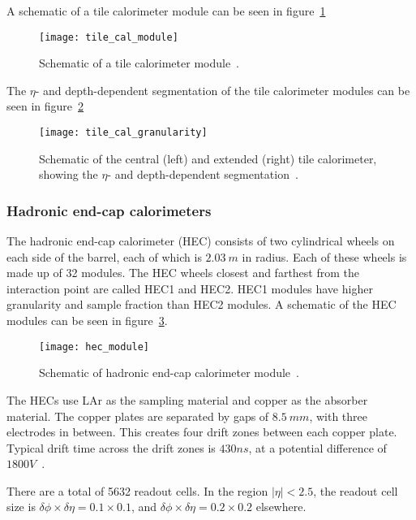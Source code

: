 A schematic of a tile calorimeter module can be seen in figure~\ref{fig:tile_cal_module}

\begin{figure}[!ht]\centering
\texttt{[image: tile\_cal\_module]}
\caption{Schematic of a tile calorimeter module~\cite{atlas-detector-2008}.}
\label{fig:tile_cal_module}
\end{figure}

The $\eta$- and depth-dependent segmentation of the tile calorimeter modules can be seen in figure~\ref{fig:tile_cal_granularity}

\begin{figure}[!ht]\centering
\texttt{[image: tile\_cal\_granularity]}
\caption{Schematic of the central (left) and extended (right) tile calorimeter, showing the $\eta$- and depth-dependent segmentation~\cite{atlas-detector-2008}.}
\label{fig:tile_cal_granularity}
\end{figure}

\subsubsection{Hadronic end-cap calorimeters}

The hadronic end-cap calorimeter (HEC) consists of two cylindrical wheels on each side of the barrel,
each of which is $2.03~m$ in radius.
Each of these wheels is made up of 32 modules.
The HEC wheels closest and farthest from the interaction point are called HEC1 and HEC2.
HEC1 modules have higher granularity and sample fraction than HEC2 modules.
A schematic of the HEC modules can be seen in figure~\ref{fig:hec_module}.

\begin{figure}[!ht]\centering
\texttt{[image: hec\_module]}
\caption{Schematic of hadronic end-cap calorimeter module~\cite{atlas-detector-2008}.}
\label{fig:hec_module}
\end{figure}

The HECs use LAr as the sampling material and copper as the absorber material.
The copper plates are separated by gaps of $8.5~mm$, with three electrodes in between.
This creates four drift zones between each copper plate.
Typical drift time across the drift zones is $430 ns$, at a potential difference of $1800 V$~\cite{atlas-detector-2008}.

There are a total of 5632 readout cells.
In the region $|\eta| < 2.5$, the readout cell size is $\delta\phi \times \delta\eta = 0.1 \times 0.1$, and $\delta\phi \times \delta\eta = 0.2 \times 0.2$ elsewhere.

